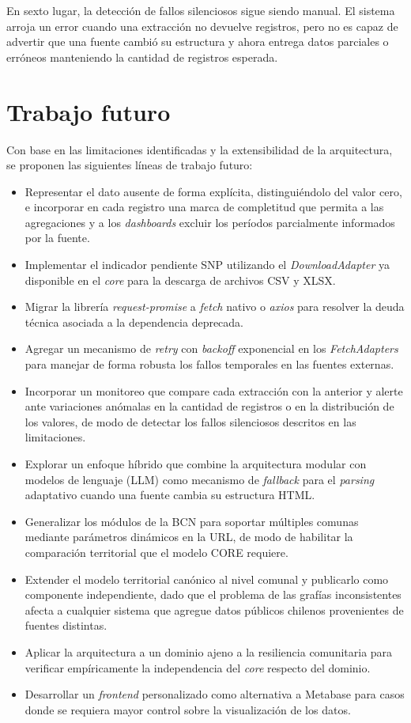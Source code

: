 \documentclass[12pt,letterpaper,oneside]{report}
\begin{document}
En sexto lugar, la detecci\'on de fallos silenciosos sigue siendo manual. El sistema arroja un error cuando una extracci\'on no devuelve registros, pero no es capaz de advertir que una fuente cambi\'o su estructura y ahora entrega datos parciales o err\'oneos manteniendo la cantidad de registros esperada.

\section{Trabajo futuro}
\label{sec:trabajo-futuro}

Con base en las limitaciones identificadas y la extensibilidad de la arquitectura, se proponen las siguientes l\'ineas de trabajo futuro:

\begin{itemize}
  \item Representar el dato ausente de forma expl\'icita, distingui\'endolo del valor cero, e incorporar en cada registro una marca de completitud que permita a las agregaciones y a los \textit{dashboards} excluir los per\'iodos parcialmente informados por la fuente.
  \item Implementar el indicador pendiente SNP utilizando el \textit{DownloadAdapter} ya disponible en el \textit{core} para la descarga de archivos CSV y XLSX.
  \item Migrar la librer\'ia \textit{request-promise} a \textit{fetch} nativo o \textit{axios} para resolver la deuda t\'ecnica asociada a la dependencia deprecada.
  \item Agregar un mecanismo de \textit{retry} con \textit{backoff} exponencial en los \textit{FetchAdapters} para manejar de forma robusta los fallos temporales en las fuentes externas.
  \item Incorporar un monitoreo que compare cada extracci\'on con la anterior y alerte ante variaciones an\'omalas en la cantidad de registros o en la distribuci\'on de los valores, de modo de detectar los fallos silenciosos descritos en las limitaciones.
  \item Explorar un enfoque h\'ibrido que combine la arquitectura modular con modelos de lenguaje (LLM) como mecanismo de \textit{fallback} para el \textit{parsing} adaptativo cuando una fuente cambia su estructura HTML.
  \item Generalizar los m\'odulos de la BCN para soportar m\'ultiples comunas mediante par\'ametros din\'amicos en la URL, de modo de habilitar la comparaci\'on territorial que el modelo CORE requiere.
  \item Extender el modelo territorial can\'onico al nivel comunal y publicarlo como componente independiente, dado que el problema de las graf\'ias inconsistentes afecta a cualquier sistema que agregue datos p\'ublicos chilenos provenientes de fuentes distintas.
  \item Aplicar la arquitectura a un dominio ajeno a la resiliencia comunitaria para verificar emp\'iricamente la independencia del \textit{core} respecto del dominio.
  \item Desarrollar un \textit{frontend} personalizado como alternativa a Metabase para casos donde se requiera mayor control sobre la visualizaci\'on de los datos.
\end{itemize}
\end{document}
